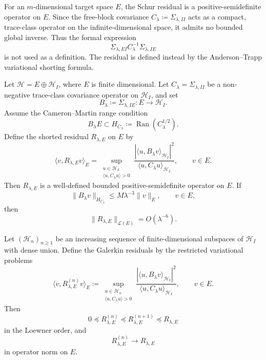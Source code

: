 For an $m$-dimensional target space $E$, the Schur residual is a
positive-semidefinite operator on $E$. Since the free-block covariance
$C_\lambda \coloneqq \Sigma_{\lambda,II}$ acts as a compact, trace-class operator
on the infinite-dimensional space, it admits no bounded global inverse. Thus
the formal expression
\[
  \Sigma_{\lambda,EI}C_\lambda^{-1}\Sigma_{\lambda,IE}
\]
is not used as a definition.  The residual is defined instead by the
Anderson--Trapp variational shorting formula.

\begin{theorem}
\label{thm:operator_residual}
Let $\mathcal H=E\oplus\mathcal H_I$, where $E$ is finite dimensional.
Let $C_\lambda=\Sigma_{\lambda,II}$ be a non-negative trace-class
covariance operator on $\mathcal H_I$, and set
\[
  B_\lambda\coloneqq \Sigma_{\lambda,IE}:E\to\mathcal H_I .
\]
Assume the Cameron--Martin range condition
\[
  B_\lambda E\subset H_{C_\lambda}
  \coloneqq \operatorname{Ran}(C_\lambda^{1/2}).
\]
Define the shorted residual $R_{\lambda,E}$ on $E$ by
\begin{equation}
\label{eq:discussion_operator_residual_form}
  \langle v,R_{\lambda,E}v\rangle_E
  =
  \sup_{\substack{u\in\mathcal H_I\\ \langle u,C_\lambda u\rangle>0}}
  \frac{|\langle u,B_\lambda v\rangle_{\mathcal H_I}|^2}
       {\langle u,C_\lambda u\rangle_{\mathcal H_I}},
  \qquad v\in E .
\end{equation}
Then $R_{\lambda,E}$ is a well-defined bounded positive-semidefinite
operator on $E$.  If
\[
  \|B_\lambda v\|_{H_{C_\lambda}}
  \le M\lambda^{-3}\|v\|_E,
  \qquad v\in E,
\]
then
\[
  \|R_{\lambda,E}\|_{\mathcal L(E)}=O(\lambda^{-6}).
\]

Let $(\mathcal H_n)_{n\ge1}$ be an increasing sequence of
finite-dimensional subspaces of $\mathcal H_I$ with dense union.  Define
the Galerkin residuals by the restricted variational problems
\begin{equation}
\label{eq:galerkin_variational_residual}
  \langle v,R_{\lambda,E}^{(n)}v\rangle_E
  \coloneqq
  \sup_{\substack{u\in\mathcal H_n\\ \langle u,C_\lambda u\rangle>0}}
  \frac{|\langle u,B_\lambda v\rangle_{\mathcal H_I}|^2}
       {\langle u,C_\lambda u\rangle_{\mathcal H_I}},
  \qquad v\in E .
\end{equation}
Then
\[
  0\preceq R_{\lambda,E}^{(n)}
  \preceq R_{\lambda,E}^{(n+1)}
  \preceq R_{\lambda,E}
\]
in the Loewner order, and
\[
  R_{\lambda,E}^{(n)}
  \longrightarrow
  R_{\lambda,E}
\]
in operator norm on $E$.
\end{theorem}

